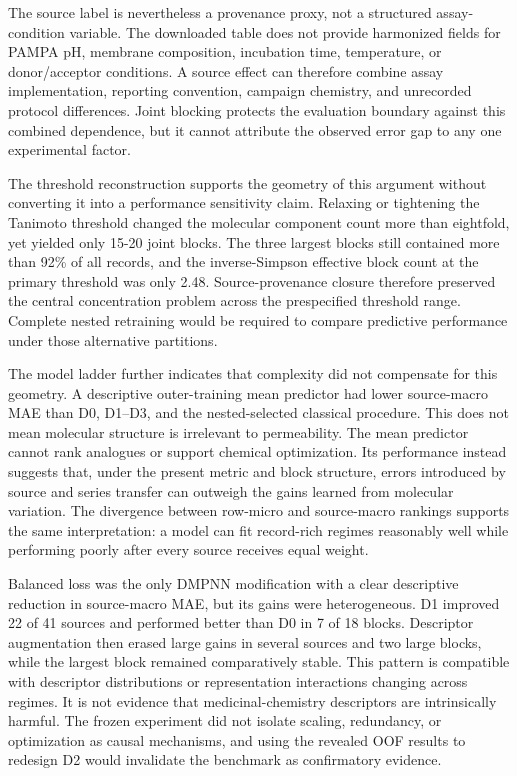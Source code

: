 \documentclass[referee,lineno,pdflatex,Numbered,sn-basic]{sn-jnl}
\begin{document}
The source label is nevertheless a provenance proxy, not a structured assay-condition variable. The downloaded table does not provide harmonized fields for PAMPA pH, membrane composition, incubation time, temperature, or donor/acceptor conditions. A source effect can therefore combine assay implementation, reporting convention, campaign chemistry, and unrecorded protocol differences. Joint blocking protects the evaluation boundary against this combined dependence, but it cannot attribute the observed error gap to any one experimental factor.

The threshold reconstruction supports the geometry of this argument without converting it into a performance sensitivity claim. Relaxing or tightening the Tanimoto threshold changed the molecular component count more than eightfold, yet yielded only 15-20 joint blocks. The three largest blocks still contained more than 92\% of all records, and the inverse-Simpson effective block count at the primary threshold was only 2.48. Source-provenance closure therefore preserved the central concentration problem across the prespecified threshold range. Complete nested retraining would be required to compare predictive performance under those alternative partitions.

The model ladder further indicates that complexity did not compensate for this geometry. A descriptive outer-training mean predictor had lower source-macro MAE than D0, D1--D3, and the nested-selected classical procedure. This does not mean molecular structure is irrelevant to permeability. The mean predictor cannot rank analogues or support chemical optimization. Its performance instead suggests that, under the present metric and block structure, errors introduced by source and series transfer can outweigh the gains learned from molecular variation. The divergence between row-micro and source-macro rankings supports the same interpretation: a model can fit record-rich regimes reasonably well while performing poorly after every source receives equal weight.

Balanced loss was the only DMPNN modification with a clear descriptive reduction in source-macro MAE, but its gains were heterogeneous. D1 improved 22 of 41 sources and performed better than D0 in 7 of 18 blocks. Descriptor augmentation then erased large gains in several sources and two large blocks, while the largest block remained comparatively stable. This pattern is compatible with descriptor distributions or representation interactions changing across regimes. It is not evidence that medicinal-chemistry descriptors are intrinsically harmful. The frozen experiment did not isolate scaling, redundancy, or optimization as causal mechanisms, and using the revealed OOF results to redesign D2 would invalidate the benchmark as confirmatory evidence.
\end{document}
